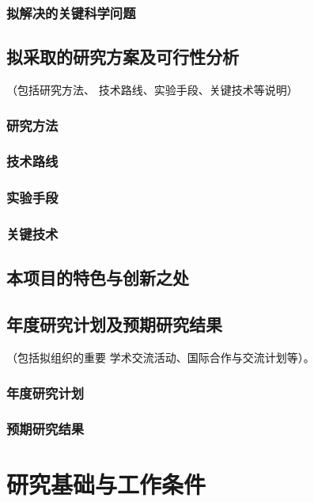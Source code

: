 \documentclass[a4paper,12pt, AutoFakeBold, fontset=adobe]{ctexart}
\begin{document}
\subsubsection{拟解决的关键科学问题}

\subsection{拟采取的研究方案及可行性分析}{\color{nsfcblue}\kaishu\noindent（包括研究方法、
  技术路线、实验手段、关键技术等说明）}


\subsubsection{研究方法}

\subsubsection{技术路线}

\subsubsection{实验手段}

\subsubsection{关键技术}

\subsection{本项目的特色与创新之处}


\subsection{年度研究计划及预期研究结果}{\color{nsfcblue}\kaishu\noindent（包括拟组织的重要
  学术交流活动、国际合作与交流计划等）。}


\subsubsection{年度研究计划}

\subsubsection{预期研究结果}

\section{研究基础与工作条件}
\end{document}
